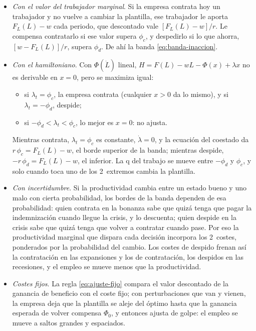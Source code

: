 \documentclass[11pt]{article}
\begin{document}
\begin{itemize}
\item \emph{Con el valor del trabajador marginal}. Si la empresa contrata hoy un trabajador y no vuelve a cambiar la plantilla, ese trabajador le aporta $F_L(L)-w$ cada periodo, que descontado vale $[F_L(L)-w]/r$. Le compensa contratarlo si ese valor supera $\phi_c$, y despedirlo si lo que ahorra, $[w-F_L(L)]/r$, supera $\phi_d$. De ahí la banda \eqref{eq:banda-inaccion}.
\item \emph{Con el hamiltoniano}. Con $\Phi(\dot L)$ lineal, $H=F(L)-wL-\Phi(x)+\lambda x$ no es derivable en $x=0$, pero se maximiza igual:
  \begin{itemize}
  \item si $\lambda_t=\phi_c$, la empresa contrata (cualquier $x>0$ da lo mismo), y si $\lambda_t=-\phi_d$, despide;
  \item si $-\phi_d<\lambda_t<\phi_c$, lo mejor es $x=0$: no ajusta.
  \end{itemize}
  Mientras contrata, $\lambda_t=\phi_c$ es constante, $\dot\lambda=0$, y la ecuación del coestado da $r\,\phi_c=F_L(L)-w$, el borde superior de la banda; mientras despide, $-r\,\phi_d=F_L(L)-w$, el inferior. La q del trabajo se mueve entre $-\phi_d$ y $\phi_c$, y solo cuando toca uno de los 2~extremos cambia la plantilla.
\item \emph{Con incertidumbre}. Si la productividad cambia entre un estado bueno y uno malo con cierta probabilidad, los bordes de la banda dependen de esa probabilidad: quien contrata en la bonanza sabe que quizá tenga que pagar la indemnización cuando llegue la crisis, y lo descuenta; quien despide en la crisis sabe que quizá tenga que volver a contratar cuando pase. Por eso la productividad marginal que dispara cada decisión incorpora los 2~costes, ponderados por la probabilidad del cambio. Los costes de despido frenan así la contratación en las expansiones y los de contratación, los despidos en las recesiones, y el empleo se mueve menos que la productividad\nocite{BentolilaBertola1990Firing,Cahuc2014Labor}.
\item \emph{Costes fijos}. La regla \eqref{eq:ajuste-fijo} compara el valor descontado de la ganancia de beneficio con el coste fijo; con perturbaciones que van y vienen, la empresa deja que la plantilla se aleje del óptimo hasta que la ganancia esperada de volver compensa $\Phi_0$, y entonces ajusta de golpe: el empleo se mueve a saltos grandes y espaciados\nocite{Hamermesh1989Labor}.
\end{itemize}
\end{document}
